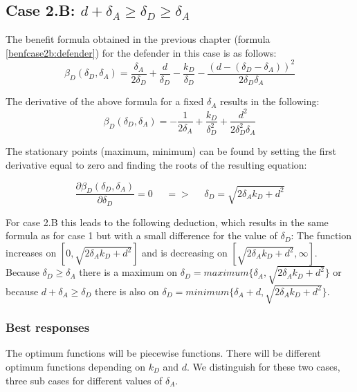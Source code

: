 \subsection*{Case 2.B: $d+\delta_{A} \geq \delta_{D} \geq  \delta_{A} $} 

The benefit formula obtained in the previous chapter  (formula \ref{benfcase2b:defender}) for the defender in this case is as follows:
\begin{equation*}
\beta_{D}(\delta_{D},\delta_{A}) = \dfrac{\delta_{A}}{2\delta_{D}} + \dfrac{d}{\delta_{D}} - \dfrac{k_{D}}{\delta_{D}} - \dfrac{(d-(\delta_{D} - \delta_{A}))^{2}}{2\delta_{D}\delta_{A}}
\end{equation*}

The derivative of the above formula for a fixed $\delta_{A}$ results in the following:
\begin{equation*}
\beta_{D}(\delta_{D},\delta_{A}) =  - \dfrac{1}{2\delta_{A}} + \dfrac{k_{D}}{\delta_{D}^{2}} + \dfrac{d^{2}}{2\delta_{D}^{2}\delta_{A}}
\end{equation*}


The stationary points (maximum, minimum) can be found by setting the first derivative equal to zero and finding the roots of the resulting equation:

\begin{equation*}
\frac{\partial \beta_{D}(\delta_{D},\delta_{A})}{\partial \delta_{D}} =0 ~~~~~~ =>~~~~~~ \delta_{D} = \sqrt{2\delta_{A}k_{D} + d^{2}}
\end{equation*}


For case 2.B this leads to the following deduction, which results in the same formula as for case 1 but with a small difference for the value of $\delta_{D}$: The function increases on $[0, \sqrt{2\delta_{A}k_{D} + d^{2}}]$ and is decreasing on $[\sqrt{2\delta_{A}k_{D} + d^{2}}, \infty]$. Because $\delta_{D} \geq \delta_{A}$ there is a maximum on $\delta_{D} = maximum \{ \delta_{A}, \sqrt{2\delta_{A}k_{D} + d^{2}} \} $ or because $d+\delta_{A} \geq \delta_{D}$ there is also on $\delta_{D} = minimum \{ \delta_{A}+d, \sqrt{2\delta_{A}k_{D} + d^{2}} \} $. \\

\subsubsection{Best responses}
The optimum functions will be piecewise functions. There will be different optimum functions depending on $k_{D}$ and $d$. We distinguish for these two cases, three sub cases for different values of $\delta_{A}$. 

